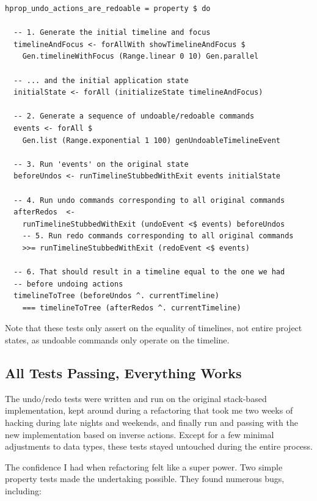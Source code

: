 \begin{verbatim}
hprop_undo_actions_are_redoable = property $ do

  -- 1. Generate the initial timeline and focus
  timelineAndFocus <- forAllWith showTimelineAndFocus $
    Gen.timelineWithFocus (Range.linear 0 10) Gen.parallel

  -- ... and the initial application state
  initialState <- forAll (initializeState timelineAndFocus)

  -- 2. Generate a sequence of undoable/redoable commands
  events <- forAll $
    Gen.list (Range.exponential 1 100) genUndoableTimelineEvent

  -- 3. Run 'events' on the original state
  beforeUndos <- runTimelineStubbedWithExit events initialState

  -- 4. Run undo commands corresponding to all original commands
  afterRedos  <-
    runTimelineStubbedWithExit (undoEvent <$ events) beforeUndos
    -- 5. Run redo commands corresponding to all original commands
    >>= runTimelineStubbedWithExit (redoEvent <$ events)

  -- 6. That should result in a timeline equal to the one we had
  -- before undoing actions
  timelineToTree (beforeUndos ^. currentTimeline)
    === timelineToTree (afterRedos ^. currentTimeline)
\end{verbatim}
Note that these tests only assert on the equality of timelines, not entire project states, as undoable commands only operate on the timeline.

\subsection{All Tests Passing, Everything Works}


The undo/redo tests were written and run on the original stack-based implementation, kept around during a refactoring that took me two weeks of hacking during late nights and weekends, and finally run and passing with the new implementation based on inverse actions. Except for a few minimal adjustments to data types, these tests stayed untouched during the entire process.

The confidence I had when refactoring felt like a super power. Two simple property tests made the undertaking possible. They found numerous bugs, including:


